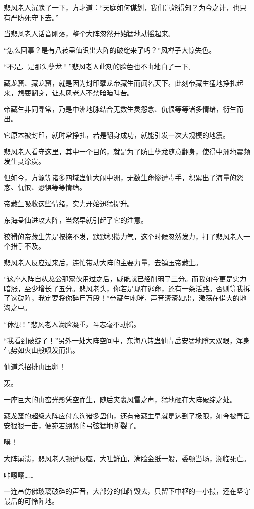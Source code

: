 \begin{this_body}
悲风老人沉默了一下，方才道：“天庭如何谋划，我们岂能得知？为今之计，也只有严防死守下去。”

当悲风老人话音刚落，整个大阵忽然开始猛地动摇起来。

“怎么回事？是有八转蛊仙识出大阵的破绽来了吗？”风禅子大惊失色。

“不是，是那头孽龙！”悲风老人此刻的脸色也不由地白了一下。

藏龙窟、藏龙窟，就是因为封印孽龙帝藏生而闻名天下。此刻帝藏生猛地挣扎起来，想要翻身，让悲风老人不禁暗暗叫苦。

帝藏生非同寻常，乃是中洲地脉结合无数生灵怨念、仇恨等等诸多情绪，衍生而出。

它原本被封印，就时常挣扎，若是翻身成功，就能引发一次大规模的地震。

悲风老人看守这里，其中一个目的，就是为了防止孽龙随意翻身，使得中洲地震频发生灵涂炭。

但如今，方源等诸多四域蛊仙大闹中洲，无数生命惨遭毒手，积累出了海量的怨念、仇恨、恐惧等等情绪。

帝藏生吸收这些情绪，实力开始迅猛提升。

东海蛊仙进攻大阵，当然早就引起了它的注意。

狡猾的帝藏生先是按捺不发，默默积攒力气，这个时候忽然发力，打了悲风老人一个措手不及。

悲风老人反应过来后，连忙带动大阵的主要力量，去镇压帝藏生。

“这座大阵自从龙公那家伙用过之后，威能就已经削弱了三分。而我如今更是实力暗涨，至少增长了五分。悲风老头，你若是现在逃命，还有一条活路。否则等我拆了这破阵，我定要将你碎尸万段！”帝藏生咆哮，声音滚滚如雷，激荡在偌大的地沟之中。

“休想！”悲风老人满脸凝重，斗志毫不动摇。

“我看到破绽了！”另外一处大阵空间中，东海八转蛊仙青岳安猛地瞪大双眼，浑身气势如火山般喷发而出。

仙道杀招排山压卵！

轰。

一座巨大的山峦光影凭空而生，随后夹裹风雷之声，猛地砸在大阵破绽之处。

藏龙窟的超级大阵应付东海诸多蛊仙，还有帝藏生早就是达到了极限，如今被青岳安狠狠一击，便宛若绷紧的弓弦猛地断裂了。

噗！

大阵崩溃，悲风老人顿遭反噬，大吐鲜血，满脸金纸一般，委顿当场，濒临死亡。

咔嚓嚓……

一连串仿佛玻璃破碎的声音，大部分的仙阵毁去，只留下中枢的一小撮，还在坚守最后的可怜阵地。


\end{this_body}
